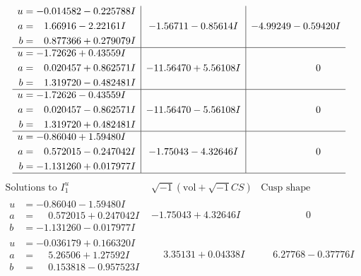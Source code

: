 \documentclass[1p]{elsarticle_modified}
\theoremstyle{definition}
\newcommand{\I}{\sqrt{-1}}
\begin{document}
$$\begin{array}{c|c|c}
\begin{aligned}
u &= -0.014582 - 0.225788 I \\
a &= \phantom{-}1.66916 - 2.22161 I \\
b &= \phantom{-}0.877366 + 0.279079 I\end{aligned}
 & -1.56711 - 0.85614 I & -4.99249 - 0.59420 I \\ \hline\begin{aligned}
u &= -1.72626 + 0.43559 I \\
a &= \phantom{-}0.020457 + 0.862571 I \\
b &= \phantom{-}1.319720 - 0.482481 I\end{aligned}
 & -11.56470 + 5.56108 I & \phantom{-0.000000 } 0 \\ \hline\begin{aligned}
u &= -1.72626 - 0.43559 I \\
a &= \phantom{-}0.020457 - 0.862571 I \\
b &= \phantom{-}1.319720 + 0.482481 I\end{aligned}
 & -11.56470 - 5.56108 I & \phantom{-0.000000 } 0 \\ \hline\begin{aligned}
u &= -0.86040 + 1.59480 I \\
a &= \phantom{-}0.572015 - 0.247042 I \\
b &= -1.131260 + 0.017977 I\end{aligned}
 & -1.75043 - 4.32646 I & \phantom{-0.000000 } 0\\
 \hline 
 \end{array}$$\newpage$$\begin{array}{c|c|c}  
\text{Solutions to }I^u_{1}& \I (\text{vol} + \sqrt{-1}CS) & \text{Cusp shape}\\
 \hline 
\begin{aligned}
u &= -0.86040 - 1.59480 I \\
a &= \phantom{-}0.572015 + 0.247042 I \\
b &= -1.131260 - 0.017977 I\end{aligned}
 & -1.75043 + 4.32646 I & \phantom{-0.000000 } 0 \\ \hline\begin{aligned}
u &= -0.036179 + 0.166320 I \\
a &= \phantom{-}5.26506 + 1.27592 I \\
b &= \phantom{-}0.153818 - 0.957523 I\end{aligned}
 & \phantom{-}3.35131 + 0.04338 I & \phantom{-}6.27768 - 0.37776 I \\ \hline\begin{aligned}

\end{aligned}
\end{array}$$
\end{document}
